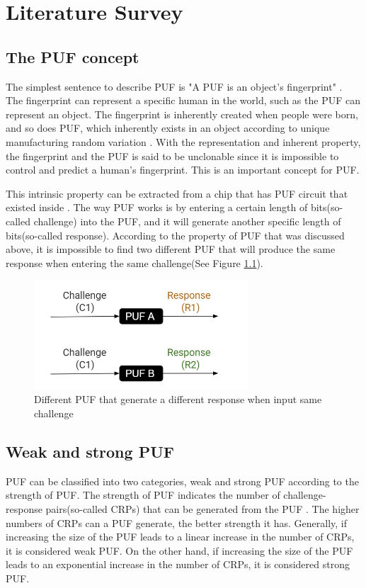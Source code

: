 \chapter{Literature Survey}

\section{The PUF concept}
The simplest sentence to describe PUF is "A PUF is an object's fingerprint" \cite{Reference4}. The fingerprint can represent a specific human in the world, such as the PUF can represent
an object. The fingerprint is inherently created when people were born, and so does PUF, which inherently exists in an object according to unique manufacturing random variation \cite{Reference4}.
With the representation and inherent property, the fingerprint and the PUF is said to be unclonable since it is impossible to control and predict a human's fingerprint. This is an important concept for PUF. \par

This intrinsic property can be extracted from a chip that has PUF circuit that existed inside \cite{Reference2}. The way PUF works is by entering a certain length of bits(so-called challenge) into the PUF, and it will
generate another specific length of bits(so-called response). According to the property of PUF that was discussed above, it is impossible to find two different PUF that will produce the same response when entering the same challenge(See Figure \ref{fig:figure1}).
\begin{figure}[htp]
\centering
\includegraphics[width=8cm]{figures/figure1.jpg}
\caption{Different PUF that generate a different response when input same challenge}
\label{fig:figure1}
\end{figure}

\section{Weak and strong PUF}
PUF can be classified into two categories, weak and strong PUF according to the strength of PUF. The strength of PUF indicates the number of challenge-response pairs(so-called CRPs) that can be generated 
from the PUF \cite{Reference1}. The higher numbers of CRPs can a PUF generate, the better strength it has. Generally, if increasing the size of the PUF leads to a linear increase in the number of CRPs, it is considered weak PUF. 
On the other hand, if increasing the size of the PUF leads to an exponential increase in the number of CRPs, it is considered strong PUF.\par

